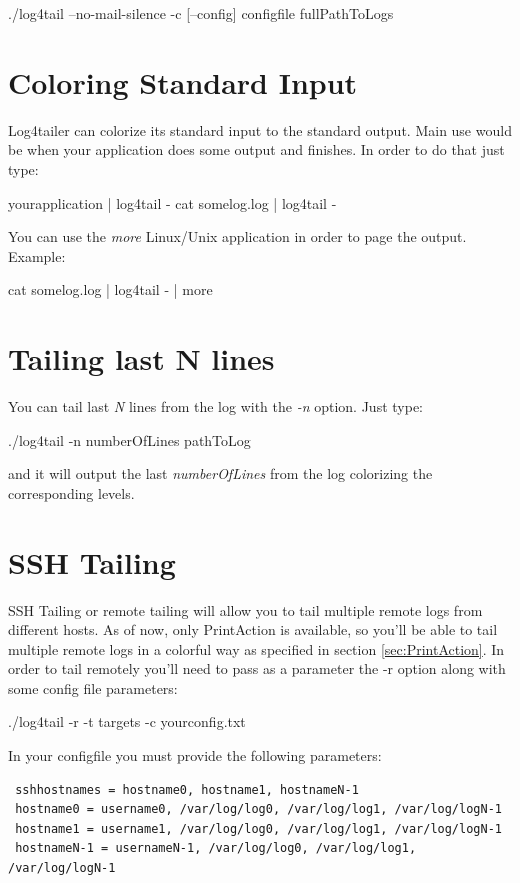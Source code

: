 \begin{cmd}
 ./log4tail --no-mail-silence -c [--config] configfile fullPathToLogs
\end{cmd}


\section{Coloring Standard Input}
Log4tailer can colorize its standard input to the standard output. Main use
would be when your application does some output and finishes. In order to do
that just type:
\begin{cmd}
 yourapplication | log4tail -
 cat somelog.log | log4tail -
\end{cmd}
You can use the \emph{more} Linux/Unix application in order to page the output.
Example:
\begin{cmd}
 cat somelog.log | log4tail - | more
\end{cmd}

\section{Tailing last N lines}
You can tail last \emph{N} lines from the log with the \emph{-n} option. Just type:
\begin{cmd}
 ./log4tail -n numberOfLines pathToLog
\end{cmd}
and it will output the last \emph{numberOfLines} from the log colorizing the
corresponding levels.

\section{SSH Tailing}
SSH Tailing or remote tailing will allow you to tail multiple remote logs from
different hosts. As of now, only PrintAction is available, so you'll be able to
tail multiple remote logs in a colorful way as specified in section
\ref{sec:PrintAction}. In order to tail remotely you'll need to pass as a
parameter the -r option along with some config file parameters:

\begin{cmd}
 ./log4tail -r -t targets -c yourconfig.txt
\end{cmd}
In your configfile you must provide the following parameters:

\begin{config}
\begin{verbatim}
 sshhostnames = hostname0, hostname1, hostnameN-1
 hostname0 = username0, /var/log/log0, /var/log/log1, /var/log/logN-1
 hostname1 = username1, /var/log/log0, /var/log/log1, /var/log/logN-1
 hostnameN-1 = usernameN-1, /var/log/log0, /var/log/log1, /var/log/logN-1
\end{verbatim}
\end{config}

